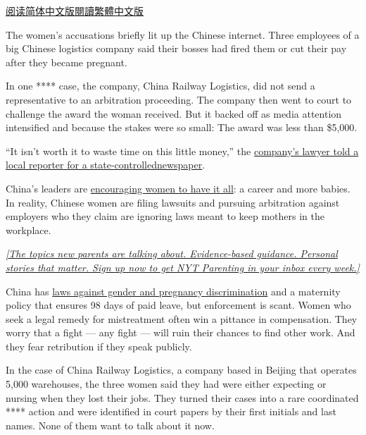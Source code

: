 \href{https://cn.nytimes3xbfgragh.onion/china/20191104/china-mothers-discrimination-working/}{阅读简体中文版}\href{https://cn.nytimes3xbfgragh.onion/china/20191104/china-mothers-discrimination-working/zh-hant/}{閱讀繁體中文版}

The women's accusations briefly lit up the Chinese internet. Three
employees of a big Chinese logistics company said their bosses had fired
them or cut their pay after they became pregnant.

In one **** case, the company, China Railway Logistics, did not send a
representative to an arbitration proceeding. The company then went to
court to challenge the award the woman received. But it backed off as
media attention intensified and because the stakes were so small: The
award was less than \$5,000.

``It isn't worth it to waste time on this little money,'' the
\href{http://www.bjnews.com.cn/news/2017/12/05/467293.html}{company's
lawyer told a local reporter for a
state-controlled}\href{http://www.bjnews.com.cn/news/2017/12/05/467293.html}{newspaper}.

China's leaders are
\href{https://www.nytimes3xbfgragh.onion/2018/08/11/world/asia/china-one-child-policy-birthrate.html}{encouraging
women to have it all}: a career and more babies. In reality, Chinese
women are filing lawsuits and pursuing arbitration against employers who
they claim are ignoring laws meant to keep mothers in the workplace.

\href{https://www.nytimes3xbfgragh.onion/newsletters/parenting?module=inline}{\emph{{[}The
topics new parents are talking about. Evidence-based guidance. Personal
stories that matter. Sign up now to get NYT Parenting in your inbox
every week.{]}}}

China has
\href{https://www.nytimes3xbfgragh.onion/2019/02/21/world/china-gender-discrimination-workplace.html}{laws
against gender and pregnancy discrimination} and a maternity policy that
ensures 98 days of paid leave, but enforcement is scant. Women who seek
a legal remedy for mistreatment often win a pittance in compensation.
They worry that a fight --- any fight --- will ruin their chances to
find other work. And they fear retribution if they speak publicly.

In the case of China Railway Logistics, a company based in Beijing that
operates 5,000 warehouses, the three women said they had were either
expecting or nursing when they lost their jobs. They turned their cases
into a rare coordinated **** action and were identified in court papers
by their first initials and last names. None of them want to talk about
it now.

